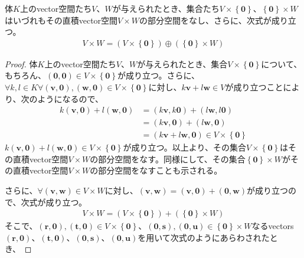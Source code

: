 \documentclass[dvipdfmx]{jsarticle}
\begin{document}
\begin{thm}\label{2.4.9.2}
体$K$上のvector空間たち$V$、$W$が与えられたとき、集合たち$V \times \left\{ \mathbf{0} \right\}$、$\left\{ \mathbf{0} \right\} \times W$はいづれもその直積vector空間$V \times W$の部分空間をなし、さらに、次式が成り立つ。
\begin{align*}
V \times W = \left( V \times \left\{ \mathbf{0} \right\} \right) \oplus \left( \left\{ \mathbf{0} \right\} \times W \right)
\end{align*}
\end{thm}
\begin{proof}
体$K$上のvector空間たち$V$、$W$が与えられたとき、集合$V \times \left\{ \mathbf{0} \right\}$について、もちろん、$\left( \mathbf{0},\mathbf{0} \right) \in V \times \left\{ \mathbf{0} \right\}$が成り立つ。さらに、$\forall k,l \in K\forall\left( \mathbf{v},\mathbf{0} \right),\left( \mathbf{w},\mathbf{0} \right) \in V \times \left\{ \mathbf{0} \right\}$に対し、$k\mathbf{v} + l\mathbf{w} \in V$が成り立つことにより、次のようになるので、
\begin{align*}
k\left( \mathbf{v},\mathbf{0} \right) + l\left( \mathbf{w},\mathbf{0} \right) &= \left( k\mathbf{v},k\mathbf{0} \right) + \left( l\mathbf{w},l\mathbf{0} \right)\\
&= \left( k\mathbf{v},\mathbf{0} \right) + \left( l\mathbf{w},\mathbf{0} \right)\\
&= \left( k\mathbf{v} + l\mathbf{w},\mathbf{0} \right) \in V \times \left\{ \mathbf{0} \right\}
\end{align*}
$k\left( \mathbf{v},\mathbf{0} \right) + l\left( \mathbf{w},\mathbf{0} \right) \in V \times \left\{ \mathbf{0} \right\}$が成り立つ。以上より、その集合$V \times \left\{ \mathbf{0} \right\}$はその直積vector空間$V \times W$の部分空間をなす。同様にして、その集合$\left\{ \mathbf{0} \right\} \times W$がその直積vector空間$V \times W$の部分空間をなすことも示される。\par
さらに、$\forall\left( \mathbf{v},\mathbf{w} \right) \in V \times W$に対し、$\left( \mathbf{v},\mathbf{w} \right) = \left( \mathbf{v},\mathbf{0} \right) + \left( \mathbf{0},\mathbf{w} \right)$が成り立つので、次式が成り立つ。
\begin{align*}
V \times W = \left( V \times \left\{ \mathbf{0} \right\} \right) + \left( \left\{ \mathbf{0} \right\} \times W \right)
\end{align*}
そこで、$\left( \mathbf{r},\mathbf{0} \right),\left( \mathbf{t},\mathbf{0} \right) \in V \times \left\{ \mathbf{0} \right\}$、$\left( \mathbf{0},\mathbf{s} \right),\left( \mathbf{0},\mathbf{u} \right) \in \left\{ \mathbf{0} \right\} \times W$なるvectors$\left( \mathbf{r},\mathbf{0} \right)$、$\left( \mathbf{t},\mathbf{0} \right)$、$\left( \mathbf{0},\mathbf{s} \right)$、$\left( \mathbf{0},\mathbf{u} \right)$を用いて次式のようにあらわされたとき、

\end{proof}
\end{document}
